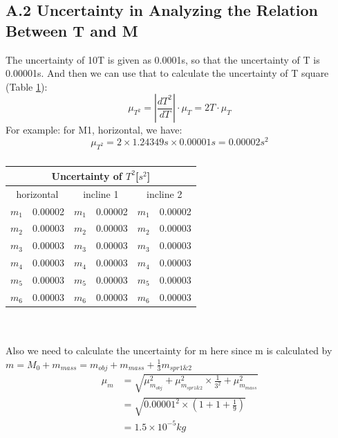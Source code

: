 \documentclass[11pt,a4paper]{article}
\begin{document}
\subsection*{A.2 Uncertainty in Analyzing the Relation Between T and M}
    \qquad The uncertainty of 10T is given as 0.0001s, so that the uncertainty of T is 0.00001s. And then we can use that to calculate the uncertainty of T square (Table \ref{uncertainty of Tsquare}):
    \begin{equation}
        \mu_{T^2}=\left |\frac{dT^2}{dT}  \right |\cdot \mu_T=2T\cdot \mu_T
        \nonumber
    \end{equation}
    \qquad For example: for M1, horizontal, we have:
    \begin{equation*}
        \mu_{T^2}=2\times 1.24349s\times 0.00001s=0.00002s^2
    \end{equation*}
    \begin{table}[h]
        \centering
        \begin{tabular}{|c|c||c|c||c|c|}\hline
        \multicolumn{6}{|c|}{\textbf{Uncertainty of $T^2$[$s^2$]}}\\\hline 
        \multicolumn{2}{|c||}{horizontal}&\multicolumn{2}{c||}{incline 1}&\multicolumn{2}{c|}{incline 2}\\\hline
        $m_1$&0.00002 &$m_1$& 0.00002 & $m_1$&0.00002 \\\hline
        $m_2$&0.00003 & $m_2$&0.00003 & $m_2$&0.00003 \\\hline
        $m_3$&0.00003 &$m_3$& 0.00003 & $m_3$&0.00003 \\\hline
        $m_4$&0.00003 & $m_4$&0.00003 & $m_4$&0.00003 \\\hline
        $m_5$&0.00003 & $m_5$&0.00003 & $m_5$&0.00003 \\\hline
        $m_6$&0.00003 & $m_6$&0.00003 & $m_6$&0.00003\\\hline
        \end{tabular}
        \caption{}
        \label{uncertainty of Tsquare}
        \end{table}
\\\\
Also we need to calculate the uncertainty for m here since m is calculated by $m=M_0+m_{mass}=m_{obj}+m_{mass}+\frac{1}{3}m_{spr1\&2}$
\begin{equation*}
    \begin{split}
\mu_m&=\sqrt{\mu_{m_{obj}}^2+\mu_{m_{spr1\&2}}^2\times \frac{1}{3^2}+\mu_{m_{mass}}^2}\\ &=\sqrt{0.00001^2\times (1+1+\frac{1}{9})}\\ &=1.5\times 10^{-5}kg
    \end{split}
\end{equation*}
\end{document}
